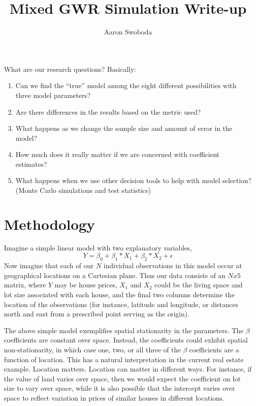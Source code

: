\documentclass{article}\usepackage[]{graphicx}\usepackage[]{color}
\title{Mixed GWR Simulation Write-up}
\author{Aaron Swoboda}
\makeatletter
\newenvironment{kframe}{%
 \def\at@end@of@kframe{}%
 \ifinner\ifhmode%
  \def\at@end@of@kframe{\end{minipage}}%
  \begin{minipage}{\columnwidth}%
 \fi\fi%
 \def\FrameCommand##1{\hskip\@totalleftmargin \hskip-\fboxsep
 \colorbox{shadecolor}{##1}\hskip-\fboxsep
     \hskip-\linewidth \hskip-\@totalleftmargin \hskip\columnwidth}%
 \MakeFramed {\advance\hsize-\width
   \@totalleftmargin\z@ \linewidth\hsize
   \@setminipage}}%
 {\par\unskip\endMakeFramed%
 \at@end@of@kframe}
\newenvironment{knitrout}{}{} %
\makeatother
\begin{document}
\maketitle

What are our research questions? Basically:
\begin{enumerate}
\item Can we find the ``true'' model among the eight different possibilities with three model parameters?
\item Are there differences in the results based on the metric used?
\item What happens as we change the sample size and amount of error in the model?
\item How much does it really matter if we are concerned with coefficient estimates?
\item What happens when we use other decision tools to help with model selection? (Monte Carlo simulations and test statistics)
\end{enumerate}


\begin{knitrout}
\color{fgcolor}\begin{kframe}


{\ttfamily\noindent\itshape\color{messagecolor}{\#\# Loading required package: animation}}\end{kframe}
\end{knitrout}


\section{Methodology}

Imagine a simple linear model with two explanatory variables,
\begin{equation}
Y = \beta _0 + \beta _1 *X_1 + \beta _2 * X_2 + \epsilon
\end{equation}
Now imagine that each of our $N$ individual observations in this model occur at geographical locations on a Cartesian plane. Thus our data consists of an $N x 5$ matrix, where $Y$ may be house prices, $X_1$ and $X_2$ could be the living space and lot size associated with each house, and the final two columns determine the location of the observations (for instance, latitude and longitude, or distances north and east from a prescribed point serving as the origin).

The above simple model exemplifies spatial stationarity in the parameters. The $\beta$ coefficients are constant over space. Instead, the coefficients could exhibit spatial non-stationarity, in which case one, two, or all three of the $\beta$ coefficients are a function of location. This has a natural interpretation in the current real estate example. Location matters. Location can matter in different ways. For instance, if the value of land varies over space, then we would expect the coefficient on lot size to vary over space, while it is also possible that the intercept varies over space to reflect variation in prices of similar houses in different locations. 
\end{document}
